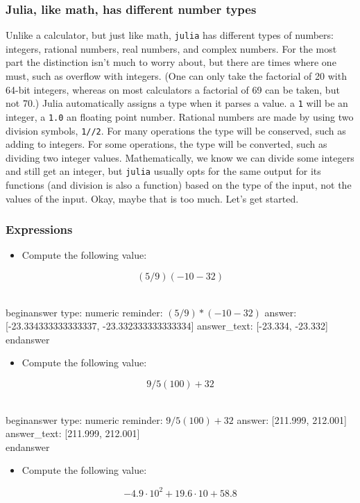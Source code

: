 \documentclass[12pt]{article}
\begin{document}
\subsubsection{Julia, like math, has different number types}\newline
Unlike a calculator, but just like math, \texttt{julia} has different types of numbers: integers, rational numbers, real numbers, and complex numbers. For the most part the distinction isn't much to worry about, but there are times where one must, such as overflow with integers. (One can only take the factorial of 20 with 64-bit integers, whereas on most calculators a factorial of 69 can be taken, but not 70.) Julia automatically assigns a type when it parses a value. a \texttt{1} will be an integer, a \texttt{1.0} an floating point number. Rational numbers are made by using two division symbols, \texttt{1//2}.\newline
For many operations the type will be conserved, such as adding to integers. For some operations, the type will be converted, such as dividing two integer values. Mathematically, we know we can divide some integers and still get an integer, but \texttt{julia} usually opts for the same output for its functions (and division is also a function) based on the type of the input, not the values of the input.\newline
Okay, maybe that is too much. Let's get started.\subsubsection{Expressions}\begin{itemize}\item Compute the following value:\end{itemize}
$$
(5/9)(-10 - 32)
$$

\\begin{answer}
    type: numeric
    reminder: \( (5/9) * (-10 - 32) \)
    answer: [-23.334333333333337, -23.332333333333334]
    answer_text: [-23.334, -23.332] 
\\end{answer}
\begin{itemize}\item  Compute the following value:\end{itemize}
$$
9/5(100) + 32
$$

\\begin{answer}
    type: numeric
    reminder: \( 9/5(100) + 32 \)
    answer: [211.999, 212.001]
    answer_text: [211.999, 212.001] 
\\end{answer}
\begin{itemize}\item Compute the following value:\end{itemize}
$$
-4.9\cdot 10^2 + 19.6\cdot 10 + 58.8 
$$
\end{document}
